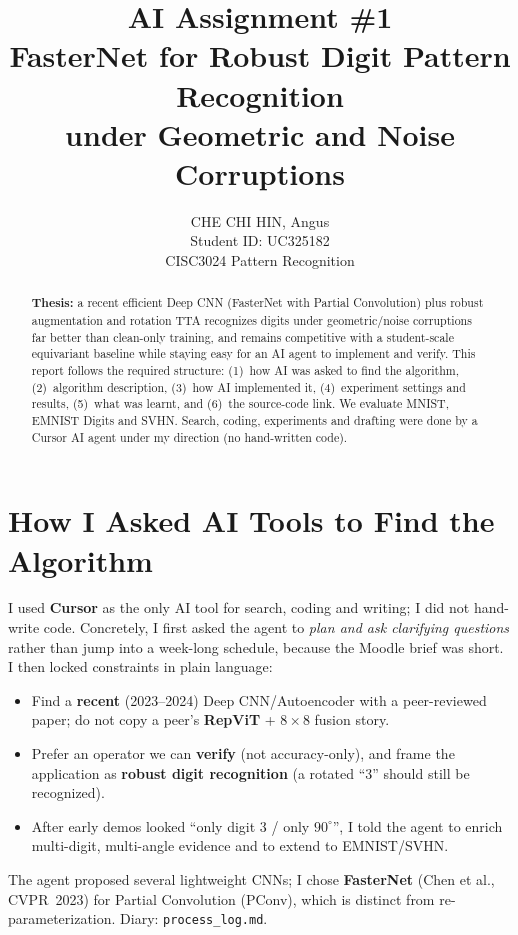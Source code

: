 \documentclass[11pt,a4paper]{article}
\title{\textbf{AI Assignment \#1}\\[0.25em]
\large FasterNet for Robust Digit Pattern Recognition\\
under Geometric and Noise Corruptions}
\author{CHE CHI HIN, Angus\\Student ID: UC325182\\CISC3024 Pattern Recognition}
\date{}
\begin{document}
\maketitle
\thispagestyle{fancy}

\begin{abstract}
\textbf{Thesis:} a recent efficient Deep CNN (FasterNet with Partial Convolution) plus robust augmentation and rotation TTA recognizes digits under geometric/noise corruptions far better than clean-only training, and remains competitive with a student-scale equivariant baseline while staying easy for an AI agent to implement and verify.
This report follows the required structure: (1)~how AI was asked to find the algorithm, (2)~algorithm description, (3)~how AI implemented it, (4)~experiment settings and results, (5)~what was learnt, and (6)~the source-code link. We evaluate MNIST, EMNIST Digits and SVHN. Search, coding, experiments and drafting were done by a Cursor AI agent under my direction (no hand-written code).
\end{abstract}

\section{How I Asked AI Tools to Find the Algorithm}
I used \textbf{Cursor} as the only AI tool for search, coding and writing; I did not hand-write code. Concretely, I first asked the agent to \emph{plan and ask clarifying questions} rather than jump into a week-long schedule, because the Moodle brief was short. I then locked constraints in plain language:
\begin{itemize}
  \item Find a \textbf{recent} (2023--2024) Deep CNN/Autoencoder with a peer-reviewed paper; do not copy a peer's \textbf{RepViT} + $8{\times}8$ fusion story.
  \item Prefer an operator we can \textbf{verify} (not accuracy-only), and frame the application as \textbf{robust digit recognition} (a rotated ``3'' should still be recognized).
  \item After early demos looked ``only digit 3 / only $90^\circ$'', I told the agent to enrich multi-digit, multi-angle evidence and to extend to EMNIST/SVHN.
\end{itemize}
The agent proposed several lightweight CNNs; I chose \textbf{FasterNet} (Chen et al., CVPR~2023) for Partial Convolution (PConv), which is distinct from re-parameterization. Diary: \texttt{process\_log.md}.
\end{document}
